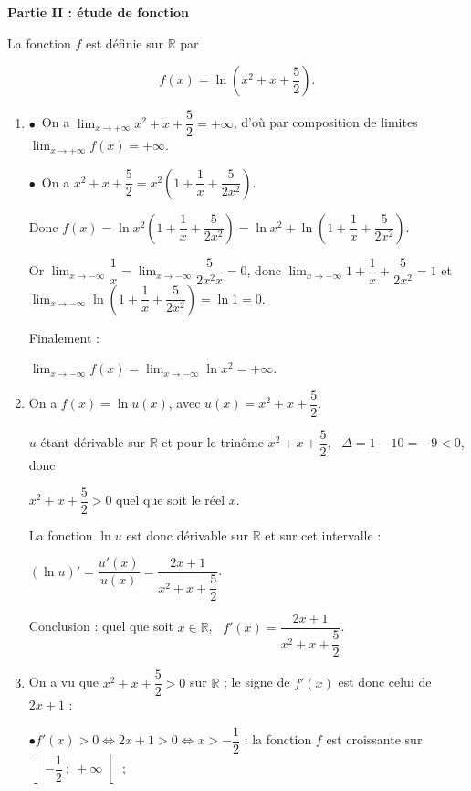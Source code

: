 \documentclass[10pt]{article}
\providecommand{\starredbullet}{\ensuremath{\bullet}}
\providecommand{\R}{\mathbb{R}}
\begin{document}
\bigskip

\textbf{Partie II : étude de fonction}

\medskip

La fonction $f$ est définie sur $\R$ par 

\[f(x) = \ln \left(x^2 + x + \dfrac{5}{2}\right).\]

\medskip

\begin{enumerate}
\item 
\starredbullet~On a $\displaystyle\lim_{x \to + \infty} x^2 + x + \dfrac{5}{2} = + \infty$, d'où par composition de limites $\displaystyle\lim_{x \to + \infty} f(x) = + \infty$.

\starredbullet~On a $x^2 + x + \dfrac{5}{2} = x^2\left(1 + \dfrac{1}{x} + \dfrac{5}{2x^2}\right)$.

Donc $f(x) = \ln x^2\left(1 + \dfrac{1}{x} + \dfrac{5}{2x^2}\right) = \ln x^2 + \ln \left(1 + \dfrac{1}{x} + \dfrac{5}{2x^2}\right)$.

Or $\displaystyle\lim_{x \to - \infty}\dfrac{1}{x} = \displaystyle\lim_{x \to - \infty}\dfrac{5}{2x^2x} = 0$, donc 
$\displaystyle\lim_{x \to - \infty}1 + \dfrac{1}{x} + \dfrac{5}{2x^2} = 1$ et $\displaystyle\lim_{x \to - \infty}\ln \left(1 + \dfrac{1}{x} + \dfrac{5}{2x^2}\right) = \ln 1 = 0$.

Finalement :

$\displaystyle\lim_{x \to - \infty}f(x) = \displaystyle\lim_{x \to - \infty}\ln x^2 = + \infty$.
\item 
On a $f(x) = \ln u(x)$, avec $u(x) = x^2 + x + \dfrac{5}{2}$.

$u$ étant dérivable sur $\R$ et pour le trinôme $x^2 + x + \dfrac{5}{2}$, \, $\Delta = 1 - 10 = - 9 < 0$, donc 

$x^2 + x + \dfrac{5}{2} > 0$ quel que soit le réel $x$.

La fonction $\ln u$ est donc dérivable sur $\R$ et sur cet intervalle :

$\left(\ln u \right)' = \dfrac{u'(x)}{u(x)} = \dfrac{2x + 1}{x^2 + x + \dfrac{5}{2}}$.

Conclusion : quel que soit $x \in \R$, \, $f'(x) = \dfrac{2x + 1}{x^2 + x + \dfrac{5}{2}}$.
\item 
On a vu que $x^2 + x + \dfrac{5}{2} > 0$ sur $\R$ ; le signe de $f'(x)$ est donc celui de $2x + 1$ :

\starredbullet $f'(x) > 0 \iff 2x + 1 > 0 \iff x > - \dfrac{1}{2}$ : la fonction $f$ est croissante sur $\left]- \dfrac{1}{2}~;~+ \infty\right[$ ;


\end{enumerate}
\end{document}
